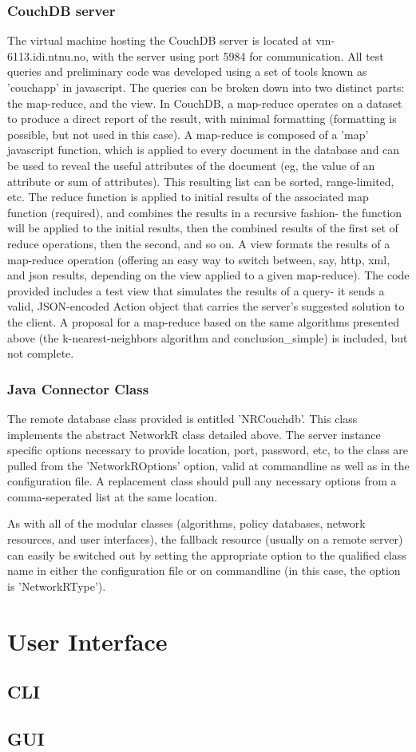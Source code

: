 \subsubsection{CouchDB server}
The virtual machine hosting the CouchDB server is located at vm-6113.idi.ntnu.no, with the server using port 5984 for communication. All test queries and preliminary code was developed using a set of tools known as 'couchapp' in javascript. The queries can be broken down into two distinct parts: the map-reduce, and the view. 
In CouchDB, a map-reduce operates on a dataset to produce a direct report of the result, with minimal formatting (formatting is possible, but not used in this case). A  map-reduce is composed of a 'map' javascript function, which is applied to every document in the database and can be used to reveal the useful attributes of the document (eg, the value of an attribute or sum of attributes). This resulting list can be sorted, range-limited, etc. The reduce function is applied to initial results of the associated map function (required), and combines the results in a recursive fashion- the function will be applied to the initial results, then the combined results of the first set of reduce operations, then the second, and so on. 
A view formats the results of a map-reduce operation (offering an easy way to switch between, say, http, xml, and json results, depending on the view applied to a given map-reduce).
The code provided includes a test view that simulates the results of a query- it sends a valid, JSON-encoded Action object that carries the server's suggested solution to the client. 
A proposal for a map-reduce based on the same algorithms presented above (the k-nearest-neighbors algorithm and conclusion\_simple) is included, but not complete.

\subsubsection{Java Connector Class}
The remote database class provided is entitled 'NRCouchdb'. This class implements the abstract NetworkR class detailed above. The server instance specific options necessary to provide location, port, password, etc, to the class are pulled from the 'NetworkROptions' option, valid at commandline as well as in the configuration file. A replacement class should pull any necessary options from a comma-seperated list at the same location.

As with all of the modular classes (algorithms, policy databases, network resources, and user interfaces), the fallback resource (usually on a remote server) can easily be switched out by setting the appropriate  option to the qualified class name in either the configuration file or on commandline (in this case, the option is 'NetworkRType').

\section{User Interface} %

\subsection{CLI}%

\subsection{GUI}%
